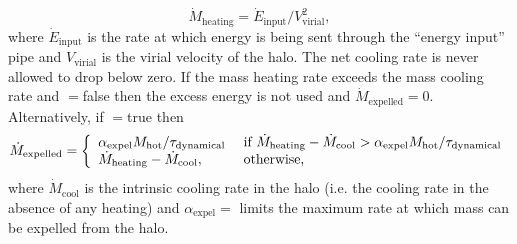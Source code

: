 \begin{equation}
 \dot{M}_\mathrm{heating} = \dot{E}_\mathrm{input} / V_\mathrm{virial}^2,
\end{equation}
where $\dot{E}_\mathrm{input}$ is the rate at which energy is being sent through the ``energy input'' pipe and $V_\mathrm{virial}$ is the virial velocity of the halo. The net cooling rate is never allowed to drop below zero. If the mass heating rate exceeds the mass cooling rate and {\normalfont \ttfamily [hotHaloExcessHeatDrivesOutflow]}$=${\normalfont \ttfamily false} then the excess energy is not used and $\dot{M}_\mathrm{expelled}=0$. Alternatively, if {\normalfont \ttfamily [hotHaloExcessHeatDrivesOutflow]}$=${\normalfont \ttfamily true} then
\begin{equation}
 \dot{M}_\mathrm{expelled} = \left\{ \begin{array}{ll} \alpha_\mathrm{expel} M_\mathrm{hot}/\tau_\mathrm{dynamical} & \hbox{ if } \dot{M}_\mathrm{heating} - \dot{M}_\mathrm{cool} > \alpha_\mathrm{expel} M_\mathrm{hot}/\tau_\mathrm{dynamical} \\ \dot{M}_\mathrm{heating} - \dot{M}_\mathrm{cool}, & \hbox{ otherwise,} \end{array} \right.
\end{equation}
where $\dot{M}_\mathrm{cool}$ is the intrinsic cooling rate in the halo (i.e. the cooling rate in the absence of any heating) and $\alpha_\mathrm{expel}=${\normalfont \ttfamily [hotHaloExpulsionRateMaximum]} limits the maximum rate at which mass can be expelled from the halo.

